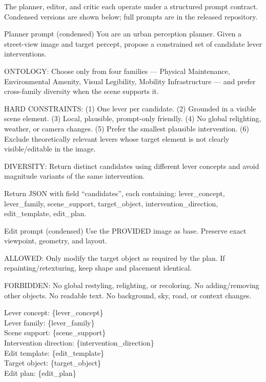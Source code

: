 The planner, editor, and critic each operate under a structured prompt
contract.  Condensed versions are shown below; full prompts are in the
released repository.

\begin{promptbox}{Planner prompt (condensed)}
\scriptsize\ttfamily
You are an urban perception planner. Given a street-view image and
target percept, propose a constrained set of candidate lever
interventions.\par\medskip
ONTOLOGY: Choose only from four families --- Physical Maintenance,
Environmental Amenity, Visual Legibility, Mobility Infrastructure ---
and prefer cross-family diversity when the scene supports it.\par\medskip
HARD CONSTRAINTS: (1) One lever per candidate. (2) Grounded in a
visible scene element. (3) Local, plausible, prompt-only friendly.
(4) No global relighting, weather, or camera changes. (5) Prefer
the smallest plausible intervention. (6) Exclude theoretically
relevant levers whose target element is not clearly visible/editable
in the image.\par\medskip
DIVERSITY: Return distinct candidates using different lever concepts
and avoid magnitude variants of the same intervention.\par\medskip
Return JSON with field ``candidates'', each containing:
lever\_concept, lever\_family, scene\_support, target\_object,
intervention\_direction, edit\_template, edit\_plan.
\end{promptbox}

\begin{promptbox}{Edit prompt (condensed)}
\scriptsize\ttfamily
Use the PROVIDED image as base. Preserve exact viewpoint, geometry,
and layout.\par\medskip
ALLOWED: Only modify the target object as required by the plan.
If repainting/retexturing, keep shape and placement identical.\par\medskip
FORBIDDEN: No global restyling, relighting, or recoloring. No
adding/removing other objects. No readable text. No background,
sky, road, or context changes.\par\medskip
Lever concept: \{lever\_concept\} \\
Lever family: \{lever\_family\} \\
Scene support: \{scene\_support\} \\
Intervention direction: \{intervention\_direction\} \\
Edit template: \{edit\_template\} \\
Target object: \{target\_object\} \\
Edit plan: \{edit\_plan\}
\end{promptbox}

